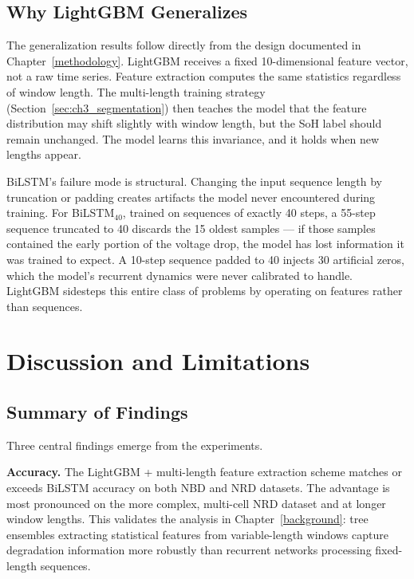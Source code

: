 \subsection{Why LightGBM Generalizes}

The generalization results follow directly from the design documented in Chapter~\ref{methodology}. LightGBM receives a fixed 10-dimensional feature vector, not a raw time series. Feature extraction computes the same statistics regardless of window length. The multi-length training strategy (Section~\ref{sec:ch3_segmentation}) then teaches the model that the feature distribution may shift slightly with window length, but the SoH label should remain unchanged. The model learns this invariance, and it holds when new lengths appear.

BiLSTM's failure mode is structural. Changing the input sequence length by truncation or padding creates artifacts the model never encountered during training. For BiLSTM$_{40}$, trained on sequences of exactly 40 steps, a 55-step sequence truncated to 40 discards the 15 oldest samples --- if those samples contained the early portion of the voltage drop, the model has lost information it was trained to expect. A 10-step sequence padded to 40 injects 30 artificial zeros, which the model's recurrent dynamics were never calibrated to handle. LightGBM sidesteps this entire class of problems by operating on features rather than sequences.


\section{Discussion and Limitations}
\label{sec:exp_discussion}

\subsection{Summary of Findings}

Three central findings emerge from the experiments.

\textbf{Accuracy.} The LightGBM + multi-length feature extraction scheme matches or exceeds BiLSTM accuracy on both NBD and NRD datasets. The advantage is most pronounced on the more complex, multi-cell NRD dataset and at longer window lengths. This validates the analysis in Chapter~\ref{background}: tree ensembles extracting statistical features from variable-length windows capture degradation information more robustly than recurrent networks processing fixed-length sequences.


